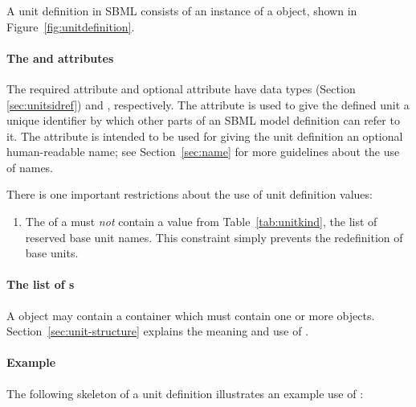 \subsubsection{}
\label{sec:unitdefinition-structure}

A unit definition in SBML consists of an instance of a
\UnitDefinition object, shown in Figure~\ref{fig:unitdefinition}.


\paragraph{The  and  attributes}

The required attribute  and optional attribute
 have data types  (Section
\ref{sec:unitsidref}) and , respectively.  The
 attribute is used to give the defined unit a unique
identifier by which other parts of an SBML model definition can
refer to it.  The  attribute is intended to be used
for giving the unit definition an optional human-readable name;
see Section~\ref{sec:name} for more guidelines about the use of
names.

There is one important restrictions about the use of unit
definition  values: 
\begin{enumerate}
  
\item The  of a \UnitDefinition must \emph{not} contain
  a value from Table~\ref{tab:unitkind}, the list of
  reserved base unit names.  This constraint simply prevents
  the redefinition of base units.

\end{enumerate}


\paragraph{The list of s}
\label{sec:listofunits}

A \UnitDefinition object may contain a \ListOfUnits container which must
contain one or more \Unit objects. Section~\ref{sec:unit-structure} explains
the meaning and use of \Unit.   

\paragraph{Example}

The following skeleton of a unit definition illustrates an example
use of \UnitDefinition:

